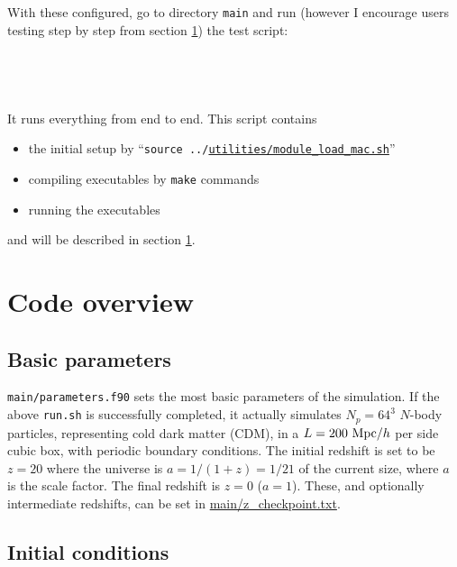 \documentclass[12pt]{article}
\begin{document}
\\\\
With these configured, go to directory {\tt main} and run (however I encourage users testing step by step from section \ref{s.code}) the test script:
\\\\
\\
\\\\
It runs everything from end to end. This script contains 
\begin{itemize}
	\item the initial setup by ``{\tt source ../\url{utilities/module_load_mac.sh}}''
	\item compiling executables by {\tt make} commands
	\item running the executables
\end{itemize}
and will be described in section \ref{s.code}.

\section{Code overview}\label{s.code}

\subsection{Basic parameters}
{\tt main/parameters.f90} sets the most basic parameters of the simulation. If the above {\tt run.sh} is successfully completed, it actually simulates $N_p=64^3$ $N$-body particles, representing cold dark matter (CDM), in a $L=200\ {\rm Mpc}/h$ per side cubic box, with periodic boundary conditions. The initial redshift is set to be $z=20$ where the universe is $a=1/(1+z)=1/21$ of the current size, where $a$ is the scale factor. The final redshift is $z=0$ ($a=1$). These, and optionally intermediate redshifts, can be set in \url{main/z_checkpoint.txt}.

\subsection{Initial conditions}
\end{document}
